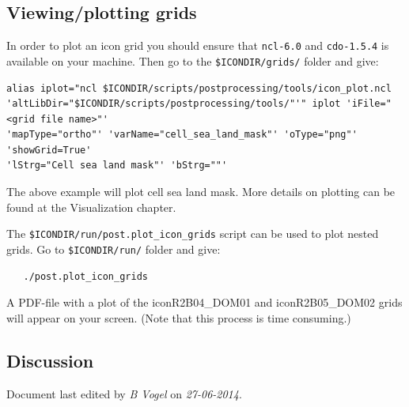 \subsection{Viewing/plotting grids}

In order to plot an icon grid you should ensure that \verb+ncl-6.0+ and \verb+cdo-1.5.4+ is available on your machine. Then go to the \verb+$ICONDIR/grids/+ folder and give:

\begin{small}
  \begin{verbatim}
alias iplot="ncl $ICONDIR/scripts/postprocessing/tools/icon_plot.ncl 
'altLibDir="$ICONDIR/scripts/postprocessing/tools/"'" iplot 'iFile="<grid file name>"' 
'mapType="ortho"' 'varName="cell_sea_land_mask"' 'oType="png"' 'showGrid=True' 
'lStrg="Cell sea land mask"' 'bStrg=""'
  \end{verbatim}
\end{small}



The above example will plot cell sea land mask. More details on plotting can be found at the Visualization chapter.

The \verb+$ICONDIR/run/post.plot_icon_grids+ script can be used to plot nested grids. Go to \verb+$ICONDIR/run/+ folder and give:

\begin{small}
  \begin{verbatim}
   ./post.plot_icon_grids  
  \end{verbatim}
\end{small}

A PDF-file with a plot of the iconR2B04\_DOM01 and iconR2B05\_DOM02 grids will appear on your screen. (Note that this process is time consuming.)

\newpage
\subsection*{Discussion}
Document last edited by \textit{B Vogel} on \textit{27-06-2014}.
